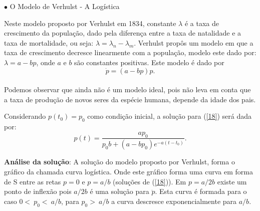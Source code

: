 \documentclass[blue]{beamer}
\numberwithin{equation}{section}
\begin{document}
\begin{frame}{}
	\justifying
	\begin{flushleft}
		$\bullet$ O Modelo de Verhulst - A Logística
	\end{flushleft}
	
	\hspace{0.2cm} Neste modelo proposto por Verhulst em 1834, constante $\lambda$ é a taxa de crescimento da população, dado pela diferença entre a taxa de natalidade e a taxa de mortalidade, ou seja: $\lambda = \lambda_n - \lambda_m$. Verhulst propôs um modelo em que a taxa de crescimento decresce linearmente com a população, modelo este dado por: $\lambda = a - bp$, onde $a$ e $b$ são constantes positivas. Este modelo é dado por
	\begin{equation} \label{18}
	\dot{p} = (a-bp)p.
	\end{equation} \\
	\hspace{0.2cm} Podemos observar que ainda não é um modelo ideal, pois não leva em conta que a taxa de produção de novos seres da espécie humana, depende da idade dos pais. 
	
\end{frame}

\begin{frame}
\justifying
\hspace{0.2cm} Considerando $p(t_0) = p_0$ como condição inicial, a solução para (\ref{18}) será dada por:
\begin{equation} \label{20}
p(t) = \dfrac{a p_0}{p_0 b + (a - bp_0)e^{-a(t-t_0)}}.
\end{equation}

\begin{flushright}
	\justifying
	\textbf{Análise da solução}: A solução do modelo proposto por Verhulst, forma o gráfico da chamada curva logística. Onde este gráfico forma uma curva em forma de S entre as retas $p = 0$ e $p = a/b$ (soluções de (\ref{18})). Em $p = a/2b$ existe um ponto de inflexão pois $a/2b$ é uma solução para $\ddot{p}$. Esta curva é formada para o caso $0 <\ p_0 <\ a/b$, para $p_0 >\ a/b$ a curva descresce exponencialmente para $a/b$. \end{flushright}

\end{frame}
\end{document}
